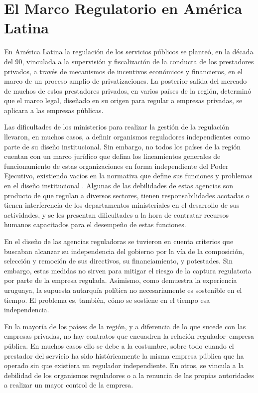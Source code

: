 \documentclass[
  12pt,
  spanish,
]{book}
\begin{document}
\hypertarget{el-marco-regulatorio-en-amuxe9rica-latina}{%
\section{El Marco Regulatorio en América
Latina}\label{el-marco-regulatorio-en-amuxe9rica-latina}}

En América Latina la regulación de los servicios públicos se planteó, en
la década del 90, vinculada a la supervisión y fiscalización de la
conducta de los prestadores privados, a través de mecanismos de
incentivos económicos y financieros, en el marco de un proceso amplio de
privatizaciones. La posterior salida del mercado de muchos de estos
prestadores privados, en varios países de la región, determinó que el
marco legal, diseñado en su origen para regular a empresas privadas, se
aplicara a las empresas públicas.

Las dificultades de los ministerios para realizar la gestión de la
regulación llevaron, en muchos casos, a definir organismos reguladores
independientes como parte de su diseño institucional. Sin embargo, no
todos los países de la región cuentan con un marco jurídico que defina
los lineamientos generales de funcionamiento de estas organizaciones en
forma independiente del Poder Ejecutivo, existiendo vacíos en la
normativa que define sus funciones y problemas en el diseño
institucional \citep{Rozas2013}. Algunas de las debilidades de estas
agencias son producto de que regulan a diversos sectores, tienen
responsabilidades acotadas o tienen interferencia de los departamentos
ministeriales en el desarrollo de sus actividades, y se les presentan
dificultades a la hora de contratar recursos humanos capacitados para el
desempeño de estas funciones.

En el diseño de las agencias reguladoras se tuvieron en cuenta criterios
que buscaban alcanzar su independencia del gobierno por la vía de la
composición, selección y remoción de sus directivos, su financiamiento,
y potestades. Sin embargo, estas medidas no sirven para mitigar el
riesgo de la captura regulatoria por parte de la empresa regulada.
Asimismo, como demuestra la experiencia uruguaya, la supuesta autarquía
política no necesariamente es sostenible en el tiempo. El problema es,
también, cómo se sostiene en el tiempo esa independencia.

En la mayoría de los países de la región, y a diferencia de lo que
sucede con las empresas privadas, no hay contratos que encuadren la
relación regulador--empresa pública. En muchos casos ello se debe a la
costumbre, sobre todo cuando el prestador del servicio ha sido
históricamente la misma empresa pública que ha operado sin que existiera
un regulador independiente. En otros, se vincula a la debilidad de los
organismos reguladores o a la renuncia de las propias autoridades a
realizar un mayor control de la empresa.
\end{document}
